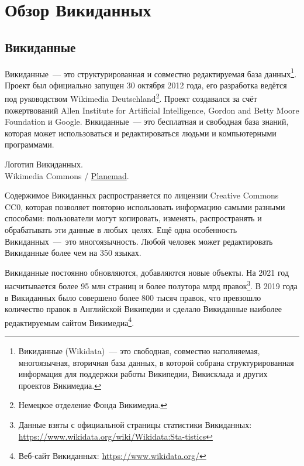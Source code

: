 \chapter{Обзор Викиданных}
\label{ch:ReviewAboutWD}

\section{Викиданные}

Викиданные~--- это структурированная и совместно редактируемая база данных\footnote[][-15pt]{Викиданные (Wikidata)~--- это свободная, совместно наполняемая, многоязычная, вторичная база данных, в которой собрана структурированная информация для поддержки работы Википедии, Викисклада и других проектов Викимедиа.}. Проект был официально запущен 30 октября 2012 года, его разработка ведётся под руководством Wikimedia Deutschland\footnote[][5pt]{Немецкое отделение Фонда Викимедиа.}. Проект создавался за счёт пожертвований Allen Institute for Artificial Intelligence, Gordon and Betty Moore Foundation и Google. Викиданные~--- это бесплатная и свободная база знаний, которая может использоваться и редактироваться людьми и компьютерными программами\autocite{Vrandecic}.\begin{marginfigure}[0.0cm]
{
	\setlength{\fboxsep}{0pt}%
	\setlength{\fboxrule}{1pt}%
}
\caption[Логотип Викиданных]{Логотип Викиданных. \\
Wikimedia Commons / \href{https://commons.wikimedia.org/wiki/File:Wikidata-logo-en.svg}{Planemad}. 
}
\label{fig:seyu}
\end{marginfigure}

Содержимое Викиданных распространяется по лицензии Creative Commons CC0, которая позволяет повторно использовать информацию самыми разными способами: пользователи могут копировать, изменять, распространять и обрабатывать эти данные в любых целях. Ещё одна особенность Викиданных~--- это многоязычность. Любой человек может редактировать Викиданные более чем на 350 языках.

Викиданные постоянно обновляются, добавляются новые объекты. На 2021 год насчитывается более 95 млн страниц и более полутора млрд правок\footnote[][5px]{Данные взяты с официальной страницы статистики Викиданных: \href{https://www.wikidata.org/wiki/Wikidata:Statistics}{https://www.wikidata.org/wiki/Wikidata:Sta-tistics}}. В 2019 года в Викиданных было совершено более 800 тысяч правок, что превзошло количество правок в Английской Википедии и сделало Викиданные наиболее редактируемым сайтом Викимедиа\footnote[][5px]{Веб-сайт Викиданных: \href{https://www.wikidata.org/}{https://www.wikidata.org/}}.

